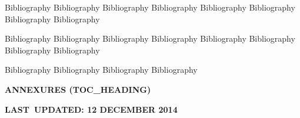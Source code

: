 \documentclass[12pt]{report}
\begin{document}
\begin{FlushLeft}
Bibliography Bibliography Bibliography Bibliography Bibliography Bibliography Bibliography Bibliography 
\end{FlushLeft}\par

\begin{FlushLeft}
Bibliography Bibliography Bibliography Bibliography Bibliography Bibliography Bibliography Bibliography 
\end{FlushLeft}\par

\begin{FlushLeft}
Bibliography Bibliography Bibliography Bibliography 
\end{FlushLeft}\par




\newpage

\vspace{\baselineskip}\begin{FlushLeft}
{\fontsize{14pt}{16.8pt}\selectfont \textbf{\uppercase{Annexures (TOC\_Heading)}}\par}
\end{FlushLeft}\par

\begin{FlushLeft}
{\fontsize{14pt}{16.8pt}\selectfont \textbf{\uppercase{Last\ Updated:  12 December 2014}}\par}
\end{FlushLeft}\par
\end{document}
